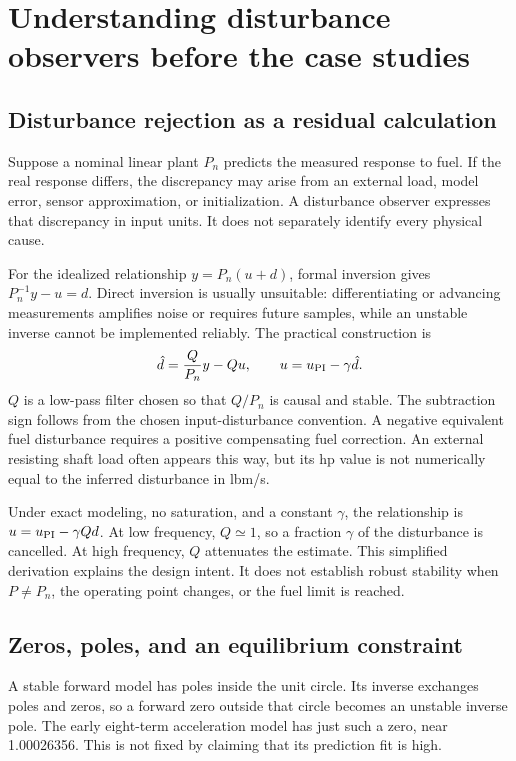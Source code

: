 \chapter{Understanding disturbance observers before the case studies}
\section{Disturbance rejection as a residual calculation}
Suppose a nominal linear plant $P_n$ predicts the measured response to fuel. If the real response differs, the discrepancy may arise from an external load, model error, sensor approximation, or initialization. A disturbance observer expresses that discrepancy in input units. It does not separately identify every physical cause.

For the idealized relationship $y=P_n(u+d)$, formal inversion gives $P_n^{-1}y-u=d$. Direct inversion is usually unsuitable: differentiating or advancing measurements amplifies noise or requires future samples, while an unstable inverse cannot be implemented reliably. The practical construction is
\begin{equation}\hat d=\frac{Q}{P_n}y-Qu,\qquad u=u_{\rm PI}-\gamma\hat d.
\end{equation}
$Q$ is a low-pass filter chosen so that $Q/P_n$ is causal and stable. The subtraction sign follows from the chosen input-disturbance convention. A negative equivalent fuel disturbance requires a positive compensating fuel correction. An external resisting shaft load often appears this way, but its hp value is not numerically equal to the inferred disturbance in lbm/s.

Under exact modeling, no saturation, and a constant $\gamma$, the relationship is $u=u_{\rm PI}-\gamma Qd$. At low frequency, $Q\simeq1$, so a fraction $\gamma$ of the disturbance is cancelled. At high frequency, $Q$ attenuates the estimate. This simplified derivation explains the design intent. It does not establish robust stability when $P\ne P_n$, the operating point changes, or the fuel limit is reached.

\section{Zeros, poles, and an equilibrium constraint}
A stable forward model has poles inside the unit circle. Its inverse exchanges poles and zeros, so a forward zero outside that circle becomes an unstable inverse pole. The early eight-term acceleration model has just such a zero, near 1.00026356. This is not fixed by claiming that its prediction fit is high.

